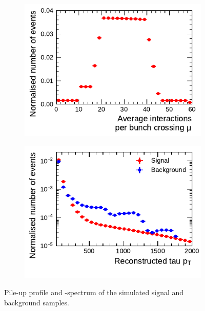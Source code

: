 \begin{figure}[htb]
  \centering
  \begin{subfigure}[t]{0.48\textwidth}
    \centering
    \includegraphics{./figures/bdt_perf/pt_mu_samples/mu.pdf}
  \end{subfigure}\hfill
  \begin{subfigure}[t]{0.48\textwidth}
    \centering
    \includegraphics{./figures/bdt_perf/pt_mu_samples/pt.pdf}
  \end{subfigure}
  \caption[Pile-up profile and \pt-spectrum of simulated signal and background
  samples]{Pile-up profile and \pt-spectrum of the simulated signal and
    background samples.}
  \label{fig:pt_mu}
\end{figure}

